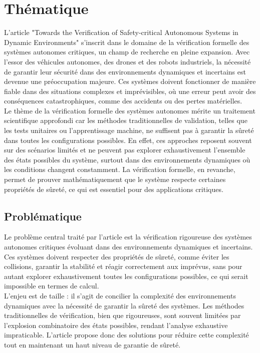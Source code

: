 \documentclass[../CSC_5RO10_TA.tex]{subfiles}
\begin{document}
\section{Thématique}
\noindent L'article "Towards the Verification of Safety-critical Autonomous Systems in Dynamic Environments" s'inscrit dans le domaine de la vérification formelle des systèmes autonomes critiques, un champ de recherche en pleine expansion. Avec l'essor des véhicules autonomes, des drones et des robots industriels, la nécessité de garantir leur sécurité dans des environnements dynamiques et incertains est devenue une préoccupation majeure. Ces systèmes doivent fonctionner de manière fiable dans des situations complexes et imprévisibles, où une erreur peut avoir des conséquences catastrophiques, comme des accidents ou des pertes matérielles.\\

\noindent Le thème de la vérification formelle des systèmes autonomes mérite un traitement scientifique approfondi car les méthodes traditionnelles de validation, telles que les tests unitaires ou l'apprentissage machine, ne suffisent pas à garantir la sûreté dans toutes les configurations possibles. En effet, ces approches reposent souvent sur des scénarios limités et ne peuvent pas explorer exhaustivement l'ensemble des états possibles du système, surtout dans des environnements dynamiques où les conditions changent constamment. La vérification formelle, en revanche, permet de prouver mathématiquement que le système respecte certaines propriétés de sûreté, ce qui est essentiel pour des applications critiques.

\subsection{Problématique}
\noindent Le problème central traité par l'article est la vérification rigoureuse des systèmes autonomes critiques évoluant dans des environnements dynamiques et incertains. Ces systèmes doivent respecter des propriétés de sûreté, comme éviter les collisions, garantir la stabilité et réagir correctement aux imprévus, sans pour autant explorer exhaustivement toutes les configurations possibles, ce qui serait impossible en termes de calcul.\\

\noindent L'enjeu est de taille : il s'agit de concilier la complexité des environnements dynamiques avec la nécessité de garantir la sûreté des systèmes. Les méthodes traditionnelles de vérification, bien que rigoureuses, sont souvent limitées par l'explosion combinatoire des états possibles, rendant l'analyse exhaustive impraticable. L'article propose donc des solutions pour réduire cette complexité tout en maintenant un haut niveau de garantie de sûreté.
\end{document}
